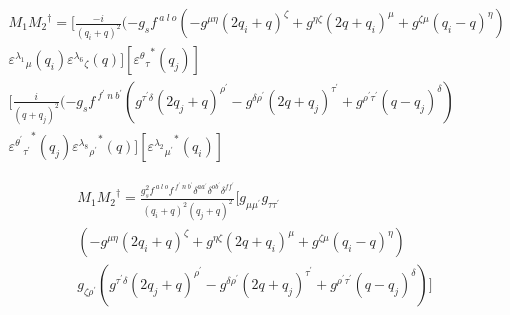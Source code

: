 \begin{equation}
\begin{split}
M_1{M_2}^{\dagger}=[\frac{-i}{(q_i +q)^2}(-g_s f^{\:a\:l\:o}(-g^{{\mu}{\eta}}(2q_i+q)^{\zeta}+g^{{\eta}{\zeta}}(2q +q_i)^{\mu}+g^{{\zeta}{\mu}}(q_i -q)^{\eta})\\
{\varepsilon^{\lambda_1}}_{\mu} (q_i) {\varepsilon^{\lambda_6}}_{\zeta}(q)][{{\varepsilon^{\theta}}_{{\tau}}}^* (q_j)]\\
[\frac{i}{(q +q_j)^2}(-g_s f^{\:f^{\prime}\:n\: b^{\prime}}(g^{{{\tau}^{\prime}}{{\delta}}}(2q_j+q)^{{\rho}^{\prime}}-g^{{{\delta}}{{\rho}^{\prime}}}(2q +q_j)^{{\tau}^{\prime}}+g^{{{\rho}^{\prime}}{{\tau}^{\prime}}}(q-q_j)^{{\delta}})\\
{{\varepsilon^{{\theta}^{\prime}}}_{{\tau}^{\prime}}}^* (q_j){{\varepsilon^{\lambda_8}}_{{\rho}^{\prime}}}^* (q)][{{\varepsilon^{\lambda_2}}_{{\mu}^{\prime}}}^* (q_i)]
\end{split}
\end{equation}



\begin{equation}
\begin{split}
M_1{M_2}^{\dagger}=\frac{g_s^2 f^{\:a\:l\:o} f^{\:f^{\prime}\:n\: b^{\prime}} \delta^{aa^{\prime}} \delta^{ob^{\prime}} \delta^{ff^{\prime}}}{(q_i +q)^2 (q_j +q)^2}
[g_{{\mu}{{\mu}^{\prime}}} g_{{\tau}{{\tau}^{\prime}}}\\(-g^{{\mu}{\eta}}(2q_i+q)^{\zeta}+g^{{\eta}{\zeta}}(2q +q_i)^{\mu}+g^{{\zeta}{\mu}}(q_i -q)^{\eta})\\g_{{{\zeta}}{{\rho}^{\prime}}}(g^{{{\tau}^{\prime}}{{\delta}}}(2q_j+q)^{{\rho}^{\prime}}-g^{{{\delta}}{{\rho}^{\prime}}}(2q +q_j)^{{\tau}^{\prime}}+g^{{{\rho}^{\prime}}{{\tau}^{\prime}}}(q-q_j)^{{\delta}})]
\end{split}
\end{equation}


